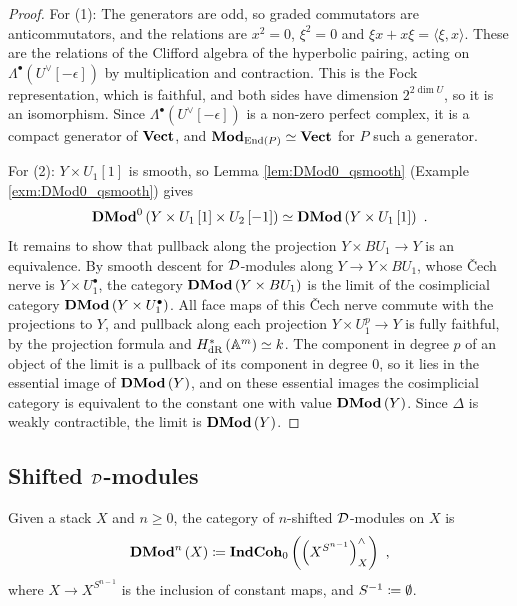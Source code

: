 \begin{proof}
For (1): The generators are odd, so graded commutators are anticommutators, and the relations
are $x^2=0$, $\xi^2=0$ and $\xi x+x\xi=\langle\xi,x\rangle$. These are the relations of the Clifford
algebra of the hyperbolic pairing, acting on $\Lambda^\bullet\left(U^\vee\left[-\epsilon\right]\right)$
by multiplication and contraction. This is the Fock representation, which is faithful, and both
sides have dimension $2^{2\dim U}$, so it is an isomorphism. Since
$\Lambda^\bullet\left(U^\vee\left[-\epsilon\right]\right)$ is a non-zero perfect complex, it is a
compact generator of $\mathbf{Vect}$, and $\mathbf{Mod}_{\operatorname{End}\left(P\right)}\simeq\mathbf{Vect}$ for $P$ such a generator.

For (2): $Y\times U_1\left[1\right]$ is smooth, so Lemma \ref{lem:DMod0_qsmooth} (Example
\ref{exm:DMod0_qsmooth}) gives
\begin{equation*}
\mathbf{DMod}^0\left(Y\times U_1\left[1\right]\times U_2\left[-1\right]\right)\simeq
\mathbf{DMod}\left(Y\times U_1\left[1\right]\right) \ .
\end{equation*}
It remains to show that pullback along the projection
$Y\times BU_1\to Y$ is an equivalence. By smooth descent for $\mathcal{D}$-modules \cite{GR:v2} along
$Y\to Y\times BU_1$, whose \v{C}ech nerve is $Y\times U_1^{\bullet}$, the category
$\mathbf{DMod}\left(Y\times BU_1\right)$ is the limit of the cosimplicial category
$\mathbf{DMod}\left(Y\times U_1^\bullet\right)$. All face maps of this \v{C}ech nerve commute with the
projections to $Y$, and pullback along each projection $Y\times U_1^p\to Y$ is fully faithful, by
the projection formula and $H^*_{\text{dR}}\left(\mathbb{A}^m\right)\simeq k$. The component in degree $p$ of an
object of the limit is a pullback of its component in degree $0$, so it lies in the essential
image of $\mathbf{DMod}\left(Y\right)$, and on these essential images the cosimplicial category is
equivalent to the constant one with value $\mathbf{DMod}\left(Y\right)$. Since $\Delta$ is weakly
contractible, the limit is $\mathbf{DMod}\left(Y\right)$.
\end{proof}

\subsection{Shifted \texorpdfstring{$\mathcal{D}$}{D}-modules}

\begin{defn}
\label{defn:DMod_n}
Given a stack $X$ and $n\geq 0$,
the category of $n$-shifted $\mathcal{D}$-modules on $X$ is
\begin{equation*}
\mathbf{DMod}^n\left(X\right) \coloneqq
\mathbf{IndCoh}_0\left(
\left(
X^{S^{n-1}}
\right)^{\wedge}_X
\right) \ ,
\end{equation*}
where $X\to X^{S^{n-1}}$ is the inclusion of constant maps, and $S^{-1}\coloneqq\emptyset$.
\end{defn}

